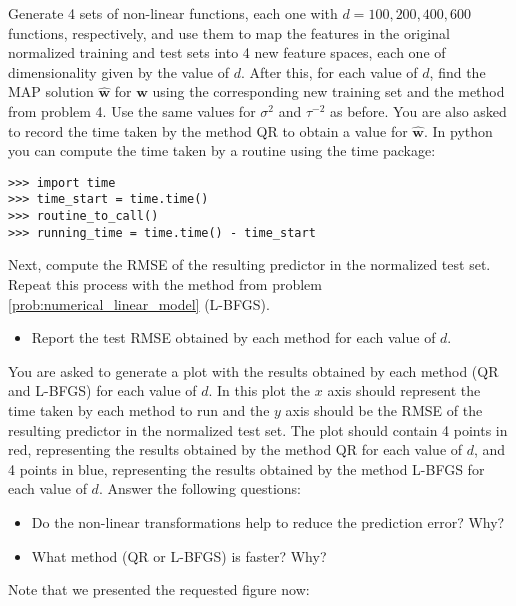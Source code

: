 \documentclass[submit]{harvardml}
\theoremstyle{plain}
\begin{document}
\begin{problem}[14pts]\label{prob:non_linear_model}
Generate 4 sets of non-linear functions, each one with $d=100, 200, 400, 600$ functions, respectively, and use
them to map the features in the original normalized training and test sets into
4 new feature spaces, each one of dimensionality given by the value of $d$. After this, for each
value of $d$, find the MAP solution $\hat{\mathbf{w}}$ for $\mathbf{w}$ using the
corresponding new training set and the method from problem
4. Use the same values for $\sigma^2$ and $\tau^{-2}$ as before.
You are also asked to
record the time taken by the method QR to obtain a value for $\hat{\mathbf{w}}$.
In python  you can compute the time taken by a routine using the time package:
\begin{verbatim}
>>> import time
>>> time_start = time.time()
>>> routine_to_call()
>>> running_time = time.time() - time_start
\end{verbatim}
Next, compute the RMSE of the resulting predictor in the normalized test
set. Repeat this process with the method from problem
\ref{prob:numerical_linear_model} (L-BFGS).

\begin{itemize}
\item Report the test RMSE obtained by each method for each value of $d$.
\end{itemize}

You are asked to generate a plot
with the results obtained by each method (QR and L-BFGS)
for each value of $d$. In this plot
the $x$ axis should represent the time taken by each method to
run and the $y$ axis should be the RMSE of the resulting predictor in the
normalized test set. The plot should
contain 4 points in red, representing the results obtained by the method QR for
each value of $d$, and 4 points in blue, representing the results obtained
by the method L-BFGS for each value of $d$. Answer the following questions:
\begin{itemize}
\item Do the non-linear transformations help to reduce the prediction error? Why?
\item What method (QR or L-BFGS) is faster? Why?
\end{itemize}
\end{problem}

Note that we presented the requested figure now:
\begin{figure}[h!]
\end{figure}
\end{document}
